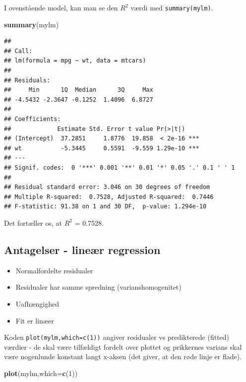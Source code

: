 \documentclass[
]{book}
\newenvironment{Shaded}{\begin{snugshade}}{\end{snugshade}}
\newcommand{\AttributeTok}[1]{\textcolor[rgb]{0.13,0.29,0.53}{#1}}
\newcommand{\DecValTok}[1]{\textcolor[rgb]{0.00,0.00,0.81}{#1}}
\newcommand{\FunctionTok}[1]{\textcolor[rgb]{0.13,0.29,0.53}{\textbf{#1}}}
\newcommand{\NormalTok}[1]{#1}
\providecommand{\tightlist}{%
  \setlength{\itemsep}{0pt}\setlength{\parskip}{0pt}}
\theoremstyle{definition}
\theoremstyle{definition}
\theoremstyle{definition}
\theoremstyle{definition}
\theoremstyle{remark}
\begin{document}
I ovenstående model, kan man se den \(R^2\) værdi med \texttt{summary(mylm)}.

\begin{Shaded}
\begin{Highlighting}[]
\FunctionTok{summary}\NormalTok{(mylm)}
\end{Highlighting}
\end{Shaded}

\begin{verbatim}
## 
## Call:
## lm(formula = mpg ~ wt, data = mtcars)
## 
## Residuals:
##     Min      1Q  Median      3Q     Max 
## -4.5432 -2.3647 -0.1252  1.4096  6.8727 
## 
## Coefficients:
##             Estimate Std. Error t value Pr(>|t|)    
## (Intercept)  37.2851     1.8776  19.858  < 2e-16 ***
## wt           -5.3445     0.5591  -9.559 1.29e-10 ***
## ---
## Signif. codes:  0 '***' 0.001 '**' 0.01 '*' 0.05 '.' 0.1 ' ' 1
## 
## Residual standard error: 3.046 on 30 degrees of freedom
## Multiple R-squared:  0.7528, Adjusted R-squared:  0.7446 
## F-statistic: 91.38 on 1 and 30 DF,  p-value: 1.294e-10
\end{verbatim}

Det fortæller os, at \(R^2\) = 0.7528.

\subsection{Antagelser - lineær regression}\label{antagelser---lineuxe6r-regression}

\begin{itemize}
\tightlist
\item
  Normalfordelte residualer
\item
  Residualer har samme spredning (varianshomogenitet)
\item
  Uafhængighed
\item
  Fit er linæer
\end{itemize}

Koden \texttt{plot(mylm,which=c(1))} angiver residualer vs predikterede (fitted) værdier - de skal være tilfældigt fordelt over plottet og prikkernes varians skal være nogenlunde konstant langt x-aksen (det giver, at den røde linje er flade).

\begin{Shaded}
\begin{Highlighting}[]
\FunctionTok{plot}\NormalTok{(mylm,}\AttributeTok{which=}\FunctionTok{c}\NormalTok{(}\DecValTok{1}\NormalTok{))}
\end{Highlighting}
\end{Shaded}
\end{document}
